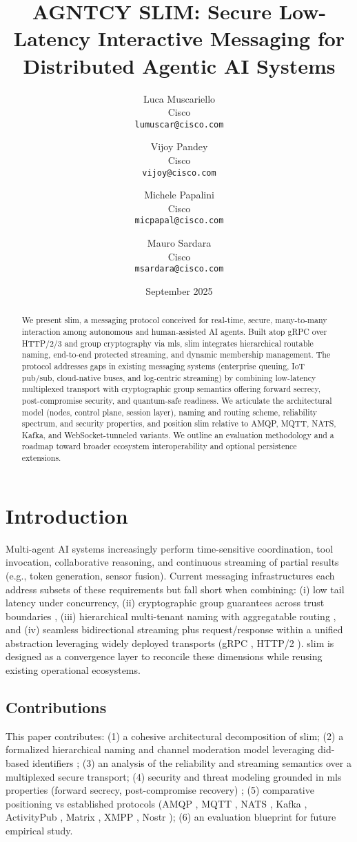 \documentclass{article}
\title{AGNTCY SLIM: Secure Low-Latency Interactive Messaging for Distributed Agentic AI Systems}
\author{Luca Muscariello \\ Cisco \\ \texttt{lumuscar@cisco.com}
\and Vijoy Pandey \\ Cisco \\ \texttt{vijoy@cisco.com}
  \and Michele Papalini \\ Cisco \\ \texttt{micpapal@cisco.com}
  \and Mauro Sardara \\ Cisco \\ \texttt{msardara@cisco.com}}
\date{September 2025}
\newcommand{\HTTP}{HTTP/2\slash3}
\theoremstyle{definition}
\theoremstyle{remark}
\begin{document}
\maketitle
\begin{abstract}
We present \gls{slim}, a messaging protocol conceived for real-time, secure,
many-to-many interaction among autonomous and human-assisted AI agents. Built
atop gRPC over \HTTP{} and group cryptography via \gls{mls}, \gls{slim}
integrates hierarchical routable naming, end-to-end protected streaming, and
dynamic membership management. The protocol addresses gaps in existing
messaging systems (enterprise queuing, IoT pub/sub, cloud-native buses, and
log-centric streaming) by combining low-latency multiplexed transport with
cryptographic group semantics offering forward secrecy, post-compromise
security, and quantum-safe readiness. We articulate the architectural model
(nodes, control plane, session layer), naming and routing scheme, reliability
spectrum, and security properties, and position \gls{slim} relative to AMQP,
MQTT, NATS, Kafka, and WebSocket-tunneled variants. We outline an evaluation
methodology and a roadmap toward broader ecosystem interoperability and
optional persistence extensions.
\end{abstract}


\section{Introduction}\label{sec:intro}
Multi-agent AI systems increasingly perform time-sensitive coordination, tool
invocation, collaborative reasoning, and continuous streaming of partial
results (e.g., token generation, sensor fusion). Current messaging
infrastructures each address subsets of these requirements but fall short when
combining: (i) low tail latency under concurrency, (ii) cryptographic group
guarantees across trust boundaries \citep{rfc9420,rfc9750}, (iii) hierarchical
multi-tenant naming with aggregatable routing \citep{rfc6920,didcore}, and
(iv) seamless bidirectional streaming plus request/response within a unified
abstraction leveraging widely deployed transports (gRPC \citep{grpc}, HTTP/2
\citep{http2}). \gls{slim} is designed as a convergence layer to reconcile
these dimensions while reusing existing operational ecosystems.

\subsection{Contributions}
This paper contributes: (1) a cohesive architectural decomposition of
\gls{slim}; (2) a formalized hierarchical naming and channel moderation model
leveraging \gls{did}-based identifiers \citep{didcore,didmethods,didkey}; (3)
an analysis of the reliability and streaming semantics over a multiplexed
secure transport; (4) security and threat modeling grounded in \gls{mls}
properties (forward secrecy, post-compromise recovery)
\citep{rfc9420,rfc9750}; (5) comparative positioning vs established protocols
(AMQP \citep{amqp10}, MQTT \citep{mqtt311}, NATS \citep{nats}, Kafka
\citep{kafka}, ActivityPub \citep{activitypub}, Matrix \citep{matrixspec},
XMPP \citep{xmpp-core}, Nostr \citep{nostr}); (6) an evaluation blueprint for
future empirical study.
\end{document}
